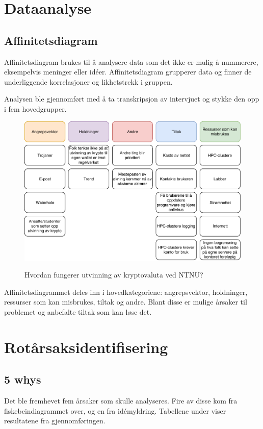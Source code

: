 \section{Dataanalyse}
\subsection{Affinitetsdiagram}
Affinitetsdiagram brukes til å analysere data som det ikke er mulig å nummerere, eksempelvis meninger eller idéer. Affinitetsdiagram grupperer data og finner de underliggende korrelasjoner og likhetstrekk i gruppen.

Analysen ble gjennomført med å ta transkripsjon av intervjuet og stykke den opp i fem hovedgrupper.     

\begin{figure}[H]
    \centering
    \includegraphics[scale=0.6]{case_3/bilder/AD.pdf}
    \label{fig:AD_miner}
    \caption{Hvordan fungerer utvinning av kryptovaluta ved NTNU?}
\end{figure}

Affinitetsdiagrammet deles inn i hovedkategoriene: angrepsvektor, holdninger, ressurser som kan misbrukes, tiltak og andre. Blant disse er mulige årsaker til problemet og anbefalte tiltak som kan løse det. 




\section{Rotårsaksidentifisering}
\subsection{5 whys}
Det ble fremhevet fem årsaker som skulle analyseres. Fire av disse kom fra fiskebeindiagrammet over, og en fra idémyldring. Tabellene under viser resultatene fra gjennomføringen. 

